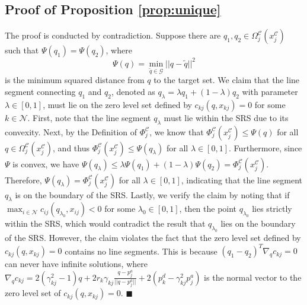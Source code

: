 \documentclass[journal]{IEEEtran}
\newenvironment{Proof}{\noindent{\em Proof:\/}}{\hfill $\blacksquare$\par}
\newcommand{\G}{\mathcal{G}}
\newcommand{\N}{\mathcal{N}}
\newcommand{\C}{\mathcal{C}}
\newcommand{\1}{\mathbf{1}}
\begin{document}
\subsection{Proof of Proposition \ref{prop:unique}}\label{proof:unique}
\begin{Proof}
The proof is conducted by contradiction. Suppose there are $q_1,q_2\in \Omega^\C_j(x^\C_j)$ such that $\Psi(q_1)=\Psi(q_2)$, where
\begin{equation}\label{fun:psi}
	\Psi(q)=\min_{\tilde{q}\in \G}||q-\tilde{q}||^2
\end{equation}
is the minimum squared distance from $q$ to the target set. We claim that the line segment connecting $q_1$ and $q_2$, denoted as $q_\lambda=\lambda q_1+(1-\lambda)q_2$ with parameter $\lambda\in [0,1]$, must lie on the zero level set defined by $c_{kj}(q,x_{kj})=0$ for some $k\in \N$. First, note that the line segment $q_\lambda$ must lie within the SRS due to its convexity. Next, by the Definition of $\Phi^\C_j$, we know that $\Phi^\C_j(x^\C_j)\leq \Psi(q)$ for all $q\in \Omega^\C_j(x^\C_j)$, and thus $\Phi^\C_j(x^\C_j)\leq \Psi(q_\lambda)$ for all $\lambda\in [0,1]$. Furthermore, since $\Psi$ is convex, we have $\Psi(q_\lambda)\leq \lambda \Psi(q_1)+(1-\lambda)\Psi(q_2)=\Phi^\C_j(x^\C_j)$. Therefore, $\Psi(q_\lambda)=\Phi^\C_j(x^\C_j)$ for all $\lambda\in [0,1]$, indicating that the line segment $q_\lambda$ is on the boundary of the SRS. Lastly, we verify the claim by noting that if $\max_{i\in \N}c_{ij}(q_{\lambda_0},x_{ij})<0$ for some $\lambda_0\in [0,1]$, then the point $q_{\lambda_0}$ lies strictly within the SRS, which would contradict the result that $q_{\lambda_0}$ lies on the boundary of the SRS. However, the claim violates the fact that the zero level set defined by $c_{kj}(q,x_{kj})=0$ contains no line segments. This is because $(q_1-q_2)^T\nabla_q c_{kj}=0$ can never have infinite solutions, where $\nabla_q c_{kj}=2(\gamma_{kj}^2-1)q+2r_k\gamma_{kj}\frac{q-p^a_j}{||q-p^a_j||}+2(p^d_k-\gamma_{kj}^2p^a_j)$ is the normal vector to the zero level set of $c_{kj}(q,x_{kj})=0$.
\end{Proof}
\end{document}
